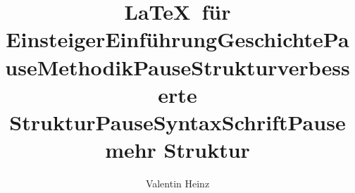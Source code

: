 \documentclass[]{beamer}
\date{}
\author{Valentin Heinz}
\title{\LaTeX \ für Einsteiger}
\begin{document}
\maketitle
\title{Einführung}


\title{Geschichte}


\title{Pause}


\title{Methodik}


\title{Pause}


\title{Struktur}


\title{verbesserte Struktur}


\title{Pause}


\title{Syntax}

\title{Schrift}


\title{Pause}


\title{mehr Struktur}

\end{document}
